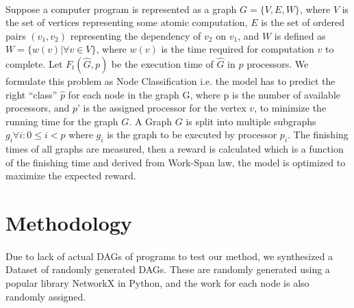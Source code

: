 \documentclass[a4paper,twocolumn]{article}
\begin{document}
    \paragraph{}
    Suppose a computer program is represented as a graph \( G = \{ V, E, W \} \), where \( V \) is the set of vertices representing some atomic computation, \( E \) is the set of ordered pairs \( (v_1, v_2) \) representing the dependency of \( v_2 \) on \( v_1 \), and \( W \) is defined as 
    \( W = \{ w(v) | \forall v \in V \} \), where \( w(v) \) is the time required for computation \( v \) to complete.
    Let \( F_t(\hat{G}, p) \) be the execution time of \( \hat{G} \) in \( p \) processors. 
    We formulate this problem as Node Classification i.e. the model has to predict the right “class” \( \hat{p} \) for each node in the graph G, where p is the number of available processors, and \( p’ \) is the assigned processor for the vertex \( v \), to minimize the running time for the graph \( G \).
    A Graph \( G \) is split into multiple subgraphs \( g_i \forall i : 0 \leq i < p \) where \( g_i \) is the graph to be executed by processor \( p_i \). The finishing times of all graphs are measured, then a reward is calculated which is a function of the finishing time and derived from Work-Span law, the model is optimized to maximize the expected reward.

\section{Methodology}
    \paragraph{}
    Due to lack of actual DAGs of programs to test our method, we synthesized a Dataset of randomly generated DAGs. These are randomly generated using a popular library NetworkX in Python, and the work for each node is also randomly assigned. 
        
\end{document}
